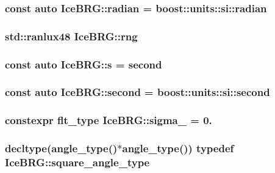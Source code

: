 \subsubsection[{radian}]{\setlength{\rightskip}{0pt plus 5cm}const auto Ice\+B\+R\+G\+::radian = boost\+::units\+::si\+::radian}\label{namespaceIceBRG_af78fec3f42ee23d596793328b8991468}
\hypertarget{namespaceIceBRG_a43349d2fe56e49b46f2da45c2472137d}{}
\subsubsection[{rng}]{\setlength{\rightskip}{0pt plus 5cm}std\+::ranlux48 Ice\+B\+R\+G\+::rng}\label{namespaceIceBRG_a43349d2fe56e49b46f2da45c2472137d}
\hypertarget{namespaceIceBRG_ad0b9ada1ad5ccc9d88c2050483109e06}{}
\subsubsection[{s}]{\setlength{\rightskip}{0pt plus 5cm}const auto Ice\+B\+R\+G\+::s = {\bf second}}\label{namespaceIceBRG_ad0b9ada1ad5ccc9d88c2050483109e06}
\hypertarget{namespaceIceBRG_a542d4177a57d87415daf841cf88e6b15}{}
\subsubsection[{second}]{\setlength{\rightskip}{0pt plus 5cm}const auto Ice\+B\+R\+G\+::second = boost\+::units\+::si\+::second}\label{namespaceIceBRG_a542d4177a57d87415daf841cf88e6b15}
\hypertarget{namespaceIceBRG_a110c5768e115f02bf29631b9f0bde3cc}{}
\subsubsection[{sigma\+\_\+8}]{\setlength{\rightskip}{0pt plus 5cm}constexpr {\bf flt\+\_\+type} Ice\+B\+R\+G\+::sigma\+\_ = 0.}\label{namespaceIceBRG_a110c5768e115f02bf29631b9f0bde3cc}
\hypertarget{namespaceIceBRG_af4db0ce6eb1c82d5b5bc58d9467676ea}{}
\subsubsection[{square\+\_\+angle\+\_\+type}]{\setlength{\rightskip}{0pt plus 5cm}decltype({\bf angle\+\_\+type}()$\ast${\bf angle\+\_\+type}()) typedef Ice\+B\+R\+G\+::square\+\_\+angle\+\_\+type}\label{namespaceIceBRG_af4db0ce6eb1c82d5b5bc58d9467676ea}
\hypertarget{namespaceIceBRG_ada4d38aafd54f8dff69cf92960cfa2a9}{}
